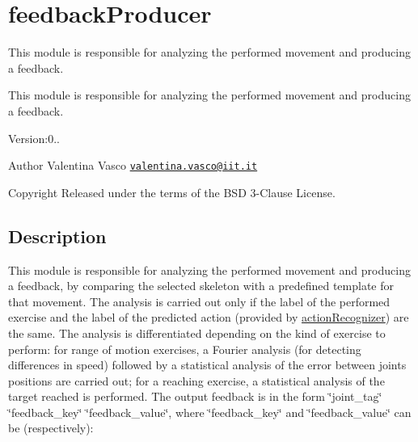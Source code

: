 \section{feedback\+Producer}
\label{group__feedbackProducer}


This module is responsible for analyzing the performed movement and producing a feedback.  


This module is responsible for analyzing the performed movement and producing a feedback. 

Version\+:0.. \begin{DoxyAuthor}{Author}
Valentina Vasco \href{mailto:valentina.vasco@iit.it}{\tt valentina.\+vasco@iit.\+it} ~\newline
 
\end{DoxyAuthor}
\begin{DoxyCopyright}{Copyright}
Released under the terms of the B\+SD 3-\/\+Clause License. 
\end{DoxyCopyright}
\hypertarget{group__skeletonViewer_intro_sec}{}\subsection{Description}\label{group__skeletonViewer_intro_sec}
This module is responsible for analyzing the performed movement and producing a feedback, by comparing the selected skeleton with a predefined template for that movement. The analysis is carried out only if the label of the performed exercise and the label of the predicted action (provided by \hyperlink{group__actionRecognizer}{action\+Recognizer}) are the same. The analysis is differentiated depending on the kind of exercise to perform\+: for range of motion exercises, a Fourier analysis (for detecting differences in speed) followed by a statistical analysis of the error between joints\textquotesingle{} positions are carried out; for a reaching exercise, a statistical analysis of the target reached is performed. The output feedback is in the form \char`\"{}joint\+\_\+tag\char`\"{} \char`\"{}feedback\+\_\+key\char`\"{} \char`\"{}feedback\+\_\+value\char`\"{}, where \char`\"{}feedback\+\_\+key\char`\"{} and \char`\"{}feedback\+\_\+value\char`\"{} can be (respectively)\+:
